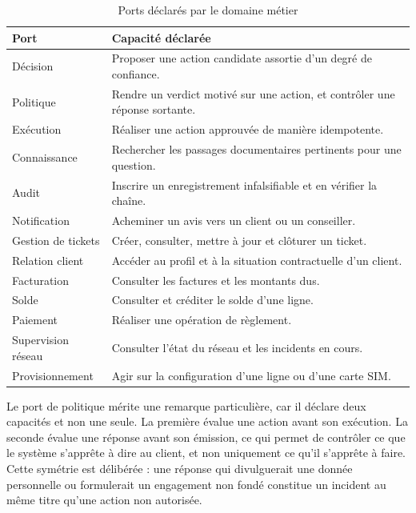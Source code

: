 \begin{table}[H]
\centering
\renewcommand{\arraystretch}{1.2}
\begin{tabular}{|p{3.0cm}|p{11.5cm}|}
\hline
\textbf{Port} & \textbf{Capacité déclarée} \\
\hline
Décision & Proposer une action candidate assortie d'un degré de confiance. \\
\hline
Politique & Rendre un verdict motivé sur une action, et contrôler une réponse sortante. \\
\hline
Exécution & Réaliser une action approuvée de manière idempotente. \\
\hline
Connaissance & Rechercher les passages documentaires pertinents pour une question. \\
\hline
Audit & Inscrire un enregistrement infalsifiable et en vérifier la chaîne. \\
\hline
Notification & Acheminer un avis vers un client ou un conseiller. \\
\hline
Gestion de tickets & Créer, consulter, mettre à jour et clôturer un ticket. \\
\hline
Relation client & Accéder au profil et à la situation contractuelle d'un client. \\
\hline
Facturation & Consulter les factures et les montants dus. \\
\hline
Solde & Consulter et créditer le solde d'une ligne. \\
\hline
Paiement & Réaliser une opération de règlement. \\
\hline
Supervision réseau & Consulter l'état du réseau et les incidents en cours. \\
\hline
Provisionnement & Agir sur la configuration d'une ligne ou d'une carte SIM. \\
\hline
\end{tabular}
\caption{Ports déclarés par le domaine métier}
\label{tab:ports}
\end{table}

Le port de politique mérite une remarque particulière, car il déclare deux capacités et non une seule. La première évalue une action avant son exécution. La seconde évalue une réponse avant son émission, ce qui permet de contrôler ce que le système s'apprête à dire au client, et non uniquement ce qu'il s'apprête à faire. Cette symétrie est délibérée : une réponse qui divulguerait une donnée personnelle ou formulerait un engagement non fondé constitue un incident au même titre qu'une action non autorisée.

